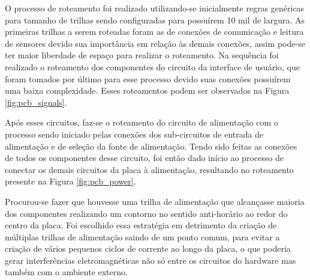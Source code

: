 O processo de roteamento foi realizado utilizando-se inicialmente regras genéricas para tamanho de trilhas sendo configuradas para possuírem 10 mil de largura. As primeiras trilhas a serem roteadas foram as de conexões de comunicação e leitura de sensores devido sua importância em relação às demais conexões, assim pode-se ter maior liberdade de espaço para realizar o roteamento. Na sequência foi realizado o roteamento dos componentes do circuito da interface de usuário, que foram tomados por último para esse processo devido suas conexões possuírem uma baixa complexidade. Esses roteamentos podem ser observados na Figura \ref{fig:pcb_signals}.


    \begin{figure}[h!]
            \captionsetup{width=10cm}
   \end{figure}

\newpage

Após esses circuitos, faz-se o roteamento do circuito de alimentação com o processo sendo iniciado pelas conexões dos sub-circuitos de entrada de alimentação e de seleção da fonte de alimentação. Tendo sido feitas as conexões de todos os componentes desse circuito, foi então dado início ao processo de conectar os demais circuitos da placa à alimentação, resultando no roteamento presente na Figura \ref{fig:pcb_power}.

Procurou-se fazer que houvesse uma trilha de alimentação que alcançasse maioria dos componentes realizando um contorno no sentido anti-horário ao redor do centro da placa. Foi escolhido essa estratégia em detrimento da criação de múltiplas trilhas de alimentação saindo de um ponto comum, para evitar a criação de vários pequenos ciclos de corrente ao longo da placa, o que poderia gerar interferências eletromagnéticas não só entre os circuitos do hardware mas também com o ambiente externo. 
    
